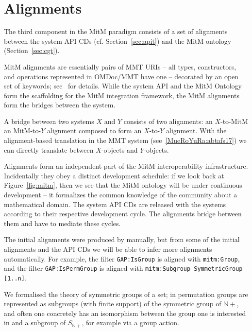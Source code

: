 \section{Alignments}\label{sec:alignments}
The third component in the MitM paradigm consists of a set of alignments between the
system API CDs (cf. Section~\ref{sec:apit}) and the MitM ontology (Section~\ref{sec:cgt}). 

MitM alignments are essentially pairs of MMT URIs -- all types, constructors, and
operations represented in OMDoc/MMT have one -- decorated by an open set of keywords;
see~\cite{MueGauKal:cacfms17} for details. While the system API and the MitM Ontology form
the scaffolding for the MitM integration framework, the MitM alignments form the bridges
between the system.

A bridge between two systems $X$ and $Y$ consists of two alignments: an $X$-to-MitM an
MitM-to-$Y$ alignment composed to form an $X$-to-$Y$ alignment. With the alignment-based
translation in the MMT system (see~\ref{MueRoYuRa:abtafs17}) we can directly translate
between $X$-objects and $Y$-objects. 

Alignments form an independent part of the MitM interoperability
infrastructure. Incidentally they obey a distinct development schedule: if we look back at
Figure~\ref{fig:mitm}, then we see that the MitM ontology will be under continuous
development -- it formalizes the common knowledge of the community about a mathematical
domain. The system API CDs are released with the systems according to their respective
development cycle. The alignments bridge between them and have to mediate these cycles.

The initial alignments were produced by manually, but from some of the initial alignments
and the \GAP API CDs we will be able to infer more alignments automatically.  For example,
the filter \texttt{GAP:IsGroup} is aligned with
\texttt{mitm:Group}, and the filter \texttt{GAP:IsPermGroup} is aligned with
\texttt{mitm:Subgroup SymmetricGroup [1..n]}.  

We formalised the theory of symmetric groups of a set; in \GAP permutation groups
are represented as subgroups (with finite support) of the symmetric group of
$\mathbb{N}+$, and often one concretely has an isomorphism between the group one
is interested in and a subgroup of $S_{\mathbb{N}+}$, for example
via a group action.

